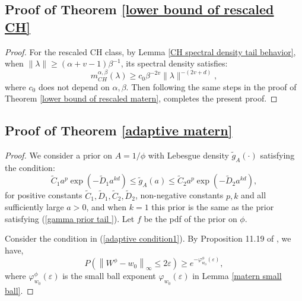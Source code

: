 \documentclass[ejs,noshowframe]{imsart}
\theoremstyle{plain}
\theoremstyle{definition}
\theoremstyle{remark}
\begin{document}
\begin{appendix}
\subsection{Proof of Theorem \ref{lower bound of rescaled CH}}
\begin{proof}
For the rescaled CH class,  by Lemma \ref{CH spectral density tail behavior}, when $\|\lambda\| \ge (\alpha+v-1)\beta^{-1}$, its spectral density satisfies:
$$
m^{\alpha,\beta}_{CH}(\lambda) \ge c_0 \beta^{-2v} \|\lambda\|^{-(2v+d)},
$$
where $c_0$ does not depend on $\alpha, \beta$. Then following the same steps in the proof of Theorem \ref{lower bound of rescaled matern}, completes the present proof.
\end{proof}



\subsection{Proof of Theorem \ref{adaptive matern}}
\begin{proof}
We consider a prior on $A=1/\phi$ with Lebesgue density $\tilde{g}_A(\cdot)$   satisfying the condition: 
\begin{equation}
\tilde{C}_1 a^p \exp \left(-\tilde{D}_1 a^{kd} \right) \leq \tilde{g}_A(a) \leq \tilde{C}_2 a^p \exp \left(-\tilde{D}_2 a^{kd}  \right) ,
\end{equation}
for positive constants $\tilde{C}_1, \tilde{D}_1, \tilde{C}
_2, \tilde{D}_2$, non-negative constants $p, k$ and all  sufficiently large $a>0$,  and when $k=1$ this prior  is the same as the prior satisfying  (\ref{gamma prior tail }).
Let $f$ be the pdf of the prior on $\phi$.


Consider the condition in (\ref{adaptive condition1}).  By Proposition 11.19 of \cite{ghosal2017fundamentals}, we have, 
\begin{equation}
    P\left(\left\|W^{\phi}-w_0\right\|_{\infty} \leq 2 \varepsilon\right) \geq e^{-\varphi_{w_0}^{\phi}(\varepsilon)},
\end{equation}
where $\varphi_{w_0}^{\phi}(\varepsilon)$ is the small ball exponent $\varphi_{w_0}(\varepsilon)$ in Lemma \ref{matern small ball}.


\end{proof}
\end{appendix}
\end{document}

